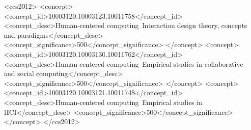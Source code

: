 \documentclass[sigconf,screen]{acmart-tagged}
\begin{document}


\begin{CCSXML}
<ccs2012>
   <concept>
       <concept_id>10003120.10003123.10011758</concept_id>
       <concept_desc>Human-centered computing~Interaction design theory, concepts and paradigms</concept_desc>
       <concept_significance>500</concept_significance>
       </concept>
   <concept>
       <concept_id>10003120.10003130.10011762</concept_id>
       <concept_desc>Human-centered computing~Empirical studies in collaborative and social computing</concept_desc>
       <concept_significance>500</concept_significance>
       </concept>
   <concept>
       <concept_id>10003120.10003121.10011748</concept_id>
       <concept_desc>Human-centered computing~Empirical studies in HCI</concept_desc>
       <concept_significance>500</concept_significance>
       </concept>
 </ccs2012>
\end{CCSXML}



\maketitle
\end{document}
